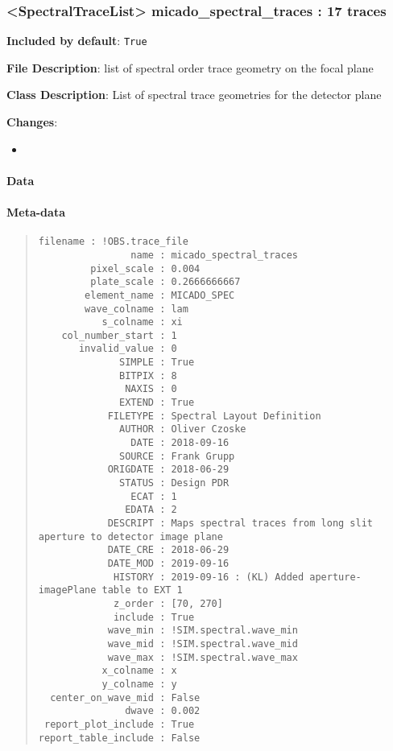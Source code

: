 \subsubsection{<SpectralTraceList> \textquotedbl{}micado\_spectral\_traces\textquotedbl{} : 17 traces%
  \label{spectraltracelist-micado-spectral-traces-17-traces}%
}

\textbf{Included by default}: \texttt{True}

\textbf{File Description}: list of spectral order trace geometry on the focal plane

\textbf{Class Description}: List of spectral trace geometries for the detector plane

\textbf{Changes}:

\begin{itemize}
\item \end{itemize}


\paragraph{Data%
  \label{id3}%
}

\begin{figure}[H]
\noindent{}\label{fig-micado-spectral-traces}
\end{figure}


\paragraph{Meta-data%
  \label{id4}%
}

\begin{quote}
\begin{alltt}
\begin{lstlisting}[frame=single]
            filename : !OBS.trace_file
                name : micado_spectral_traces
         pixel_scale : 0.004
         plate_scale : 0.2666666667
        element_name : MICADO_SPEC
        wave_colname : lam
           s_colname : xi
    col_number_start : 1
       invalid_value : 0
              SIMPLE : True
              BITPIX : 8
               NAXIS : 0
              EXTEND : True
            FILETYPE : Spectral Layout Definition
              AUTHOR : Oliver Czoske
                DATE : 2018-09-16
              SOURCE : Frank Grupp
            ORIGDATE : 2018-06-29
              STATUS : Design PDR
                ECAT : 1
               EDATA : 2
            DESCRIPT : Maps spectral traces from long slit aperture to detector image plane
            DATE_CRE : 2018-06-29
            DATE_MOD : 2019-09-16
             HISTORY : 2019-09-16 : (KL) Added aperture-imagePlane table to EXT 1
             z_order : [70, 270]
             include : True
            wave_min : !SIM.spectral.wave_min
            wave_mid : !SIM.spectral.wave_mid
            wave_max : !SIM.spectral.wave_max
           x_colname : x
           y_colname : y
  center_on_wave_mid : False
               dwave : 0.002
 report_plot_include : True
report_table_include : False
\end{lstlisting}
\end{alltt}
\end{quote}

